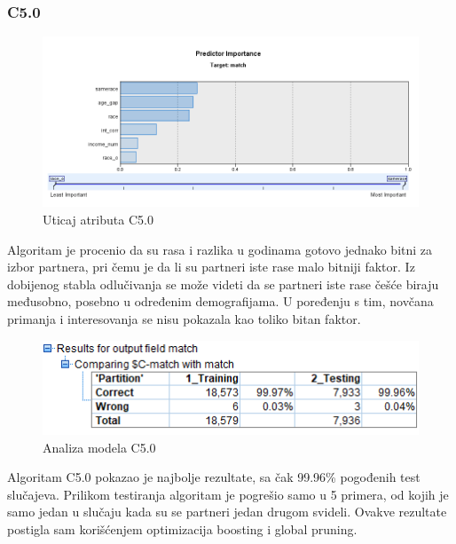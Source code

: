 \documentclass{article}
\begin{document}
\subsubsection{C5.0}
\begin{figure}[h!]
\centering
\includegraphics[scale=0.4]{graphics/impc50.png}
\caption{Uticaj atributa C5.0}
\label{fig:impc50}
\end{figure}
\FloatBarrier
Algoritam je procenio da su rasa i razlika u godinama gotovo jednako bitni za izbor partnera, pri čemu je da li su partneri iste rase malo bitniji faktor. Iz dobijenog stabla odlučivanja se može videti da se partneri iste rase češće biraju međusobno, posebno u određenim demografijama. U poređenju s tim, novčana primanja i interesovanja se nisu pokazala kao toliko bitan faktor.\par
\begin{figure}[h!]
\centering
\includegraphics[scale=0.6]{graphics/analc50.png}
\caption{Analiza modela C5.0}
\label{fig:analc50}
\end{figure}
Algoritam C5.0 pokazao je najbolje rezultate, sa čak 99.96\% pogođenih test slučajeva. Prilikom testiranja algoritam je pogrešio samo u 5 primera, od kojih je samo jedan u slučaju kada su se partneri jedan drugom svideli. Ovakve rezultate postigla sam korišćenjem optimizacija boosting i global pruning.
\FloatBarrier
\end{document}
